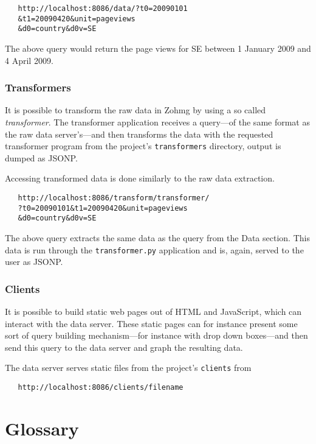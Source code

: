 \begin{verbatim}
   http://localhost:8086/data/?t0=20090101
   &t1=20090420&unit=pageviews
   &d0=country&d0v=SE
\end{verbatim}

The above query would return the page views for SE between 1 January
2009 and 4 April 2009.


\subsection*{Transformers}

It is possible to transform the raw data in Zohmg by using a so called
\textit{transformer}. The transformer application receives a query---of the same
format as the raw data server's---and then transforms the data with the
requested transformer program from the project's \texttt{transformers}
directory, output is dumped as JSONP.

Accessing transformed data is done similarly to the raw data extraction.

\begin{verbatim}
   http://localhost:8086/transform/transformer/
   ?t0=20090101&t1=20090420&unit=pageviews
   &d0=country&d0v=SE
\end{verbatim}

The above query extracts the same data as the query from the Data
section. This data is run through the \texttt{transformer.py} application and
is, again, served to the user as JSONP.


\subsection*{Clients}

It is possible to build static web pages out of HTML and JavaScript, which
can interact with the data server. These static pages can for instance
present some sort of query building mechanism---for instance with drop down
boxes---and then send this query to the data server and graph the resulting
data.

The data server serves static files from the project's \texttt{clients} from

\begin{verbatim}
   http://localhost:8086/clients/filename
\end{verbatim}



\chapter{Glossary}

